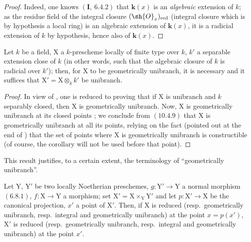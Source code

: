 \begin{proof}
Indeed, one knows $(\mathbf{I},~6.4.2)$ that $\boldsymbol{k}(x)$ is an \emph{algebraic} extension of $k$; as the
residue field of the integral closure $(\sh{O}_x)_{\mathrm{red}}$ (integral closure which is by hypothesis
a local ring) is an algebraic extension of $\boldsymbol{k}(x)$, it is a radicial extension of $k$
by hypothesis, hence also of $\boldsymbol{k}(x)$.
\end{proof}

\begin{corollary}[6.15.9]
\label{IV.6.15.9}
Let $k$ be a field, $\mathrm{X}$ a $k$-prescheme locally of finite type over $k$,
$k'$ a separable extension close of $k$ (in other words, such that the algebraic closure of $k$
is radicial over $k'$); then, for $\mathrm{X}$ to be geometrically unibranch, it is necessary and it suffices
that $\mathrm{X}'=\mathrm{X}\otimes_k k'$ be unibranch.
\end{corollary}

\begin{proof}
In view of , one is reduced to proving that if $\mathrm{X}$ is unibranch and $k$
separably closed, then $\mathrm{X}$ is geometrically unibranch. Now, $\mathrm{X}$ is geometrically
unibranch at its closed points ; we conclude from $(10.4.9)$ that $\mathrm{X}$
is geometrically unibranch at all its points, relying on the fact (pointed out
at the end of ) that the set of points where $\mathrm{X}$ is geometrically unibranch
is constructible (of course, the corollary  will not be used before that point).
\end{proof}

This result justifies, to a certain extent, the terminology of ``geometrically
unibranch''.

\begin{proposition}[6.15.10]
\label{IV.6.15.10}
Let $\mathrm{Y}$, $\mathrm{Y}'$ be two locally Noetherian preschemes, $g:\mathrm{Y}'\to\mathrm{Y}$ a
normal morphism $(6.8.1)$, $f:\mathrm{X}\to\mathrm{Y}$ a morphism; set $\mathrm{X}'=\mathrm{X}\times_\mathrm{Y}\mathrm{Y}'$ and let $p:\mathrm{X}'\to\mathrm{X}$
be the canonical projection, $x'$ a point of $\mathrm{X}'$. Then, if $\mathrm{X}$ is reduced (resp.\ geometrically unibranch,
resp.\ integral and geometrically unibranch) at the point $x=p(x')$, $\mathrm{X}'$ is reduced (resp.\ geometrically
unibranch, resp.\ integral and geometrically unibranch) at the point $x'$.
\end{proposition}

